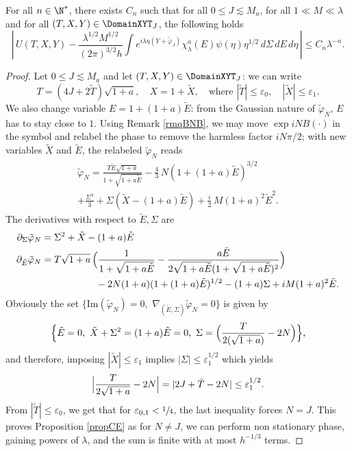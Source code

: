 \begin{prop}
\label{propCE}
For all $n \in \N^{*}$, there exists $C_{n}$ such that for all $0\leq J\lesssim M_a$, for all $1\ll M\ll \lambda$ and for all $(T,X,Y)\in \DomainXYT_{J}$, the following holds
\begin{equation*}
\label{eq:60}
\left|{\, U(T,X,Y)-\frac{\lambda^{1/2}M^{1/2}}{ (2\pi)^{3/2}h}\int e^{i\lambda \eta(Y+\tilde\varphi_{J})}\chi_{\lambda}^{a}(E)\psi(\eta)\eta^{1/2} \,d\Sigma \,dE \,d\eta \, }\right|
\leq C_{n} \lambda^{-n}.
\end{equation*}
\end{prop}
\begin{proof}

Let $0\leq J\lesssim M_a$ and let $(T,X,Y)\in\DomainXYT_J$: we can write
\[
T=(4J+2\tilde T)\sqrt{1+a}, \quad X=1+\tilde X,\quad\text{where } |\tilde T|\leq \varepsilon_0, \quad |\tilde X|\leq \varepsilon_1.
\]
We also change variable $E=1+(1+a){\tilde E}$: from the Gaussian nature of $\tilde\varphi_N$, $E$ has to stay close to $1$. Using Remark \ref{rmqBNB}, we may move $\exp{iNB(\cdot)}$ in the symbol and relabel the phase to remove the harmless factor $i N \pi/2$; with new variables $\tilde X$ and ${\tilde E}$, the relabeled $\tilde\varphi_N$ reads
\begin{multline*}
\label{eq:65}
\tilde\varphi_{N} =  \frac{T\tilde E \sqrt{1+a}}{ 1+\sqrt{1+a{\tilde E}}} - \frac 4 3\, N (1+(1+a){\tilde E})^{3/2} \\[
-5pt]
+\frac{\Sigma^{3}} 3+ \Sigma (\tilde X-(1+a){\tilde E})+\frac i 2\, M (1+a)^2 {\tilde E}^{2}.
\end{multline*}
The derivatives with respect to ${\tilde E},\Sigma$ are
\begin{align*}
\partial_{\Sigma}\tilde\varphi_N & =\Sigma^2+\tilde X-(1+a){\tilde E}\,\\
\partial_{{\tilde E}}\tilde\varphi_N & =
T\sqrt{1+a}\,\Bigl(\frac{1}{1+\sqrt{1+a{\tilde E}}}-\frac{a{\tilde E}}{2\sqrt{1+a{\tilde E}}(1+\sqrt{1+a{\tilde E}})^2}\Bigr)\\
&\hspace*{2cm}{}-2N(1+a)(1+(1+a){\tilde E})^{1/2}-(1+a)\Sigma+iM(1+a)^2{\tilde E}.
\end{align*}
Obviously the set $\{ \mathrm{Im}(\tilde\varphi_{N})=0,\,\, \nabla_{({\tilde E},\Sigma)} \tilde\varphi_{N}=0\}$ is given by
\begin{equation*}
\label{eq:66}
\Bigl\{{\tilde E}=0,\,\, \tilde X+\Sigma^{2}=(1+a){\tilde E}=0,\,\, \Sigma=\Bigl(\frac T {2(\sqrt{1+a})} -2N\Bigr)\Bigr\},
\end{equation*}
and therefore, imposing $|\tilde X|\leq \varepsilon_{1}$ implies $|\Sigma|\leq \varepsilon_{1}^{1/2}$ which yields
\[
\Bigl|\frac T{2\sqrt{1+a}}-2N\Bigr|=|2J+\tilde T-2N|\leq \varepsilon_{1}^{1/2}.
\]
From $|\tilde T|\leq \varepsilon_{0}$, we get that for $\varepsilon_{0,1}<\sfrac 14$, the last inequality forces $N=J$. This proves Proposition \ref{propCE} as for $N\neq J$, we can perform non stationary phase, gaining powers of $\lambda$, and the sum is finite with at most $h^{-1/3}$ terms.
\end{proof}

